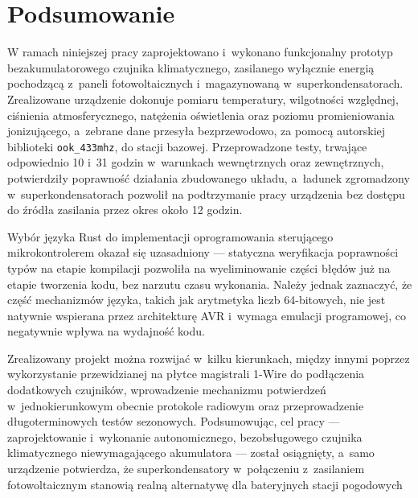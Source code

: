 \documentclass[a4paper,12pt]{book} %
\renewcommand{\chaptermark}[1]{\markboth{#1}{}}
\begin{document}








\chapter*{Podsumowanie} %
\chaptermark{Podsumowanie}

W ramach niniejszej pracy zaprojektowano i~wykonano funkcjonalny prototyp
bezakumulatorowego czujnika klimatycznego, zasilanego wyłącznie energią
pochodzącą z~paneli fotowoltaicznych i~magazynowaną w~superkondensatorach.
Zrealizowane urządzenie dokonuje pomiaru temperatury, wilgotności
względnej, ciśnienia atmosferycznego, natężenia oświetlenia oraz poziomu
promieniowania jonizującego, a~zebrane dane przesyła bezprzewodowo, za
pomocą autorskiej biblioteki \texttt{ook\_433mhz}, do stacji bazowej.
Przeprowadzone testy, trwające odpowiednio 10 i~31 godzin w~warunkach
wewnętrznych oraz zewnętrznych, potwierdziły poprawność działania
zbudowanego układu, a~ładunek zgromadzony w~superkondensatorach pozwolił
na podtrzymanie pracy urządzenia bez dostępu do źródła zasilania przez
okres około 12 godzin.
 
Wybór języka Rust do implementacji oprogramowania sterującego
mikrokontrolerem okazał się uzasadniony --- statyczna weryfikacja
poprawności typów na etapie kompilacji pozwoliła na wyeliminowanie części
błędów już na etapie tworzenia kodu, bez narzutu czasu wykonania. Należy
jednak zaznaczyć, że część mechanizmów języka, takich jak arytmetyka
liczb 64-bitowych, nie jest natywnie wspierana przez architekturę AVR
i~wymaga emulacji programowej, co negatywnie wpływa na wydajność kodu.
 
Zrealizowany projekt można rozwijać w~kilku kierunkach, między innymi
poprzez wykorzystanie przewidzianej na płytce magistrali 1-Wire do
podłączenia dodatkowych czujników, wprowadzenie mechanizmu potwierdzeń
w~jednokierunkowym obecnie protokole radiowym oraz przeprowadzenie
długoterminowych testów sezonowych. Podsumowując, cel pracy ---
zaprojektowanie i~wykonanie autonomicznego, bezobsługowego czujnika
klimatycznego niewymagającego akumulatora --- został osiągnięty, a~samo
urządzenie potwierdza, że superkondensatory w~połączeniu z~zasilaniem
fotowoltaicznym stanowią realną alternatywę dla bateryjnych stacji
pogodowych
\cleardoublepage
{}
{}
\renewcommand{\lstlistlistingname}{Spis listingów}
\lstlistoflistings{}

\cleardoublepage
{}
{}
\listoftables{}

\cleardoublepage
{}
{}
\listoffigures{}

\cleardoublepage
{}
{} %
\label{sec:bibliografia}

\end{document}
